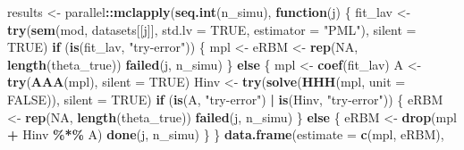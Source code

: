 \documentclass[
]{article}
\newenvironment{Shaded}{\begin{snugshade}}{\end{snugshade}}
\newcommand{\AttributeTok}[1]{\textcolor[rgb]{0.13,0.29,0.53}{#1}}
\newcommand{\ConstantTok}[1]{\textcolor[rgb]{0.56,0.35,0.01}{#1}}
\newcommand{\ControlFlowTok}[1]{\textcolor[rgb]{0.13,0.29,0.53}{\textbf{#1}}}
\newcommand{\FunctionTok}[1]{\textcolor[rgb]{0.13,0.29,0.53}{\textbf{#1}}}
\newcommand{\NormalTok}[1]{#1}
\newcommand{\OtherTok}[1]{\textcolor[rgb]{0.56,0.35,0.01}{#1}}
\newcommand{\SpecialCharTok}[1]{\textcolor[rgb]{0.81,0.36,0.00}{\textbf{#1}}}
\newcommand{\StringTok}[1]{\textcolor[rgb]{0.31,0.60,0.02}{#1}}
\begin{document}
\begin{Shaded}
\begin{Highlighting}[]
\NormalTok{results }\OtherTok{\textless{}{-}}\NormalTok{ parallel}\SpecialCharTok{::}\FunctionTok{mclapply}\NormalTok{(}\FunctionTok{seq.int}\NormalTok{(n\_simu), }\ControlFlowTok{function}\NormalTok{(j) \{}
\NormalTok{                         fit\_lav }\OtherTok{\textless{}{-}} \FunctionTok{try}\NormalTok{(}\FunctionTok{sem}\NormalTok{(mod, datasets[[j]], }\AttributeTok{std.lv =} \ConstantTok{TRUE}\NormalTok{, }\AttributeTok{estimator =} \StringTok{"PML"}\NormalTok{), }\AttributeTok{silent =} \ConstantTok{TRUE}\NormalTok{)}
                         \ControlFlowTok{if}\NormalTok{ (}\FunctionTok{is}\NormalTok{(fit\_lav, }\StringTok{"try{-}error"}\NormalTok{)) \{}
\NormalTok{                             mpl }\OtherTok{\textless{}{-}}\NormalTok{ eRBM }\OtherTok{\textless{}{-}} \FunctionTok{rep}\NormalTok{(}\ConstantTok{NA}\NormalTok{, }\FunctionTok{length}\NormalTok{(theta\_true))}
                             \FunctionTok{failed}\NormalTok{(j, n\_simu)}
\NormalTok{                         \} }\ControlFlowTok{else}\NormalTok{ \{}
\NormalTok{                             mpl }\OtherTok{\textless{}{-}} \FunctionTok{coef}\NormalTok{(fit\_lav)}
\NormalTok{                             A }\OtherTok{\textless{}{-}} \FunctionTok{try}\NormalTok{(}\FunctionTok{AAA}\NormalTok{(mpl), }\AttributeTok{silent =} \ConstantTok{TRUE}\NormalTok{)}
\NormalTok{                             Hinv }\OtherTok{\textless{}{-}} \FunctionTok{try}\NormalTok{(}\FunctionTok{solve}\NormalTok{(}\FunctionTok{HHH}\NormalTok{(mpl, }\AttributeTok{unit =} \ConstantTok{FALSE}\NormalTok{)), }\AttributeTok{silent =} \ConstantTok{TRUE}\NormalTok{)}
                             \ControlFlowTok{if}\NormalTok{ (}\FunctionTok{is}\NormalTok{(A, }\StringTok{"try{-}error"}\NormalTok{) }\SpecialCharTok{|} \FunctionTok{is}\NormalTok{(Hinv, }\StringTok{"try{-}error"}\NormalTok{)) \{}
\NormalTok{                                 eRBM }\OtherTok{\textless{}{-}} \FunctionTok{rep}\NormalTok{(}\ConstantTok{NA}\NormalTok{, }\FunctionTok{length}\NormalTok{(theta\_true))}
                                 \FunctionTok{failed}\NormalTok{(j, n\_simu)}
\NormalTok{                             \} }\ControlFlowTok{else}\NormalTok{ \{}
\NormalTok{                                 eRBM }\OtherTok{\textless{}{-}} \FunctionTok{drop}\NormalTok{(mpl }\SpecialCharTok{+}\NormalTok{ Hinv }\SpecialCharTok{\%*\%}\NormalTok{ A)}
                                 \FunctionTok{done}\NormalTok{(j, n\_simu)}
\NormalTok{                             \}}
\NormalTok{                         \}}
                         \FunctionTok{data.frame}\NormalTok{(}\AttributeTok{estimate =} \FunctionTok{c}\NormalTok{(mpl, eRBM),}

\end{Highlighting}
\end{Shaded}
\end{document}
